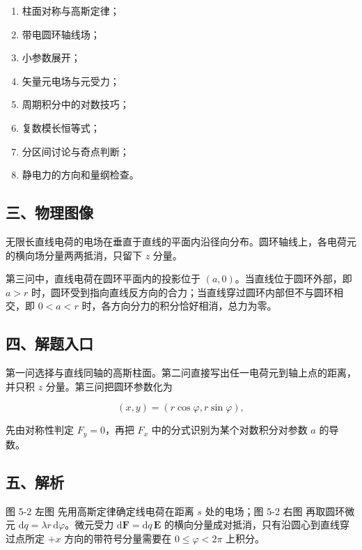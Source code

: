 \documentclass[12pt,a4paper,UTF8]{ctexart}
\newcommand{\tightlist}{\setlength{\itemsep}{0pt}\setlength{\parskip}{0pt}}
\begin{document}
\begin{enumerate}
\def\labelenumi{\arabic{enumi}.}
\tightlist
\item
  柱面对称与高斯定律；
\item
  带电圆环轴线场；
\item
  小参数展开；
\item
  矢量元电场与元受力；
\item
  周期积分中的对数技巧；
\item
  复数模长恒等式；
\item
  分区间讨论与奇点判断；
\item
  静电力的方向和量纲检查。
\end{enumerate}

\subsection{三、物理图像}\label{ux4e09ux7269ux7406ux56feux50cf-4}

无限长直线电荷的电场在垂直于直线的平面内沿径向分布。圆环轴线上，各电荷元的横向场分量两两抵消，只留下
\(z\) 分量。

第三问中，直线电荷在圆环平面内的投影位于
\((a,0)\)。当直线位于圆环外部，即 \(a>r\)
时，圆环受到指向直线反方向的合力；当直线穿过圆环内部但不与圆环相交，即
\(0<a<r\) 时，各方向分力的积分恰好相消，总力为零。

\subsection{四、解题入口}\label{ux56dbux89e3ux9898ux5165ux53e3-4}

第一问选择与直线同轴的高斯柱面。第二问直接写出任一电荷元到轴上点的距离，并只积
\(z\) 分量。第三问把圆环参数化为

\[
(x,y)=(r\cos\varphi,r\sin\varphi),
\]

先由对称性判定 \(F_y=0\)，再把 \(F_x\) 中的分式识别为某个对数积分对参数
\(a\) 的导数。

\subsection{五、解析}\label{ux4e94ux89e3ux6790-4}

图 5-2 左图 先用高斯定律确定线电荷在距离 \(s\) 处的电场；图 5-2 右图
再取圆环微元 \(\mathrm dq=\lambda r\,\mathrm d\varphi\)。微元受力
\(\mathrm d\boldsymbol F=\mathrm dq\,\boldsymbol E\)
的横向分量成对抵消，只有沿圆心到直线穿过点所定 \(+x\)
方向的带符号分量需要在 \(0\leqslant\varphi<2\pi\) 上积分。
\end{document}
